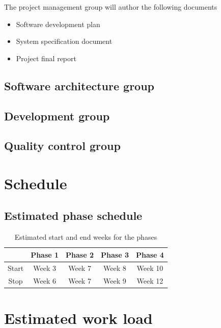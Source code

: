 \documentclass{article}
\begin{document}
            
            
            The project management group will author the following documents
            \begin{itemize}
                \item Software development plan
                \item System specification document
                \item Project final report
            \end{itemize}
    
    \subsection{Software architecture group}
            
    \subsection{Development group}
    
    \subsection{Quality control group}

\newpage

\section{Schedule}
    \subsection{Estimated phase schedule}
        \begin{table}[h]
            \centering
            \begin{tabular}{|c|c|c|c|c|}
                \hline
                            & Phase 1 & Phase 2 & Phase 3 & Phase 4 \\
                 \hline
                 Start      & Week 3  & Week 7  & Week 8  & Week 10  \\
                 \hline
                 Stop       & Week 6  & Week 7  & Week 9  & Week 12  \\
                 \hline
            \end{tabular}
            \caption{Estimated start and end weeks for the phases}
        \end{table}
    
    
    \section{Estimated work load}
        
\end{document}
